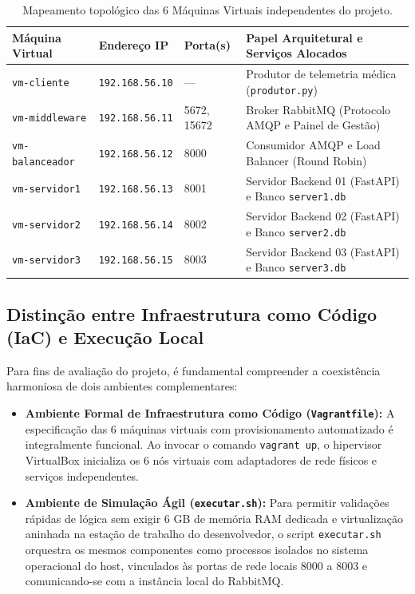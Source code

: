 \documentclass[11pt,a4paper]{article}
\begin{document}
\begin{table}[H]
\centering
\small
\begin{tabularx}{\textwidth}{l l l X}
\toprule
\textbf{Máquina Virtual} & \textbf{Endereço IP} & \textbf{Porta(s)} & \textbf{Papel Arquitetural e Serviços Alocados} \\
\midrule
\texttt{vm-cliente} & \texttt{192.168.56.10} & — & Produtor de telemetria médica (\texttt{produtor.py}) \\
\texttt{vm-middleware} & \texttt{192.168.56.11} & 5672, 15672 & Broker RabbitMQ (Protocolo AMQP e Painel de Gestão) \\
\texttt{vm-balanceador} & \texttt{192.168.56.12} & 8000 & Consumidor AMQP e Load Balancer (Round Robin) \\
\texttt{vm-servidor1} & \texttt{192.168.56.13} & 8001 & Servidor Backend 01 (FastAPI) e Banco \texttt{server1.db} \\
\texttt{vm-servidor2} & \texttt{192.168.56.14} & 8002 & Servidor Backend 02 (FastAPI) e Banco \texttt{server2.db} \\
\texttt{vm-servidor3} & \texttt{192.168.56.15} & 8003 & Servidor Backend 03 (FastAPI) e Banco \texttt{server3.db} \\
\bottomrule
\end{tabularx}
\caption{Mapeamento topológico das 6 Máquinas Virtuais independentes do projeto.}
\label{tab:vms_topologia}
\end{table}

\subsection{Distinção entre Infraestrutura como Código (IaC) e Execução Local}

Para fins de avaliação do projeto, é fundamental compreender a coexistência harmoniosa de dois ambientes complementares:
\begin{itemize}
    \item \textbf{Ambiente Formal de Infraestrutura como Código (\texttt{Vagrantfile}):} A especificação das 6 máquinas virtuais com provisionamento automatizado é integralmente funcional. Ao invocar o comando \texttt{vagrant up}, o hipervisor VirtualBox inicializa os 6 nós virtuais com adaptadores de rede físicos e serviços independentes.
    \item \textbf{Ambiente de Simulação Ágil (\texttt{executar.sh}):} Para permitir validações rápidas de lógica sem exigir 6 GB de memória RAM dedicada e virtualização aninhada na estação de trabalho do desenvolvedor, o script \texttt{executar.sh} orquestra os mesmos componentes como processos isolados no sistema operacional do host, vinculados às portas de rede locais 8000 a 8003 e comunicando-se com a instância local do RabbitMQ.
\end{itemize}
\end{document}

